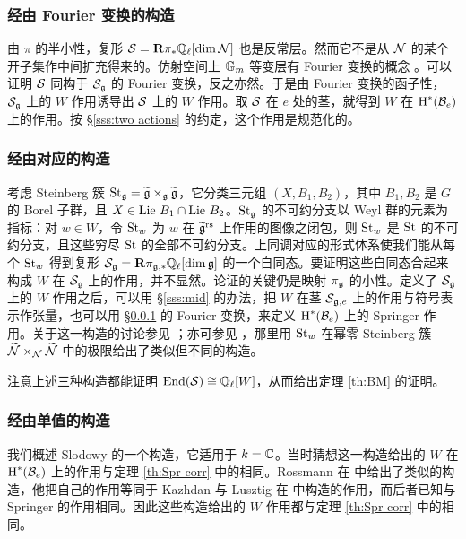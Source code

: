 \subsubsection{经由 Fourier 变换的构造}\label{sss:Four} 由 $\pi$ 的半小性，复形 $\mathcal{S}=\mathbf{R}\pi_{*}\mathbb{Q}_{\ell}[\dim\mathcal{N}]$ 也是反常层。然而它不是从 $\mathcal{N}$ 的某个开子集作中间扩充得来的。仿射空间上 $\mathbb{G}_m$ 等变层有 Fourier 变换的概念 \cite{Laumon}。可以证明 $\mathcal{S}$ 同构于 $\mathcal{S}_{\mathfrak{g}}$ 的 Fourier 变换，反之亦然。于是由 Fourier 变换的函子性，$\mathcal{S}_{\mathfrak{g}}$ 上的 $W$ 作用诱导出 $\mathcal{S}$ 上的 $W$ 作用。取 $\mathcal{S}$ 在 $e$ 处的茎，就得到 $W$ 在 $\textup{H}^{*}({\mathcal{B}_{e}})$ 上的作用。按 \S\ref{sss:two actions} 的约定，这个作用是规范化的。

\subsubsection{经由对应的构造} 考虑 Steinberg 簇 $\textup{St}_{\mathfrak{g}}=\widetilde{\mathfrak{g}}\times_{\mathfrak{g}}\widetilde{\mathfrak{g}}$，它分类三元组 $(X,B_{1},B_{2})$，其中 $B_{1},B_{2}$ 是 $G$ 的 Borel 子群，且 $X\in\textup{Lie}\  B_{1}\cap\textup{Lie}\  B_{2}$。$\textup{St}_{\mathfrak{g}}$ 的不可约分支以 Weyl 群的元素为指标：对 $w\in W$，令 $\textup{St}_{w}$ 为 $w$ 在 $\widetilde{\mathfrak{g}}^{\textup{rs}}$ 上作用的图像之闭包，则 $\textup{St}_{w}$ 是 $\textup{St}$ 的不可约分支，且这些穷尽 $\textup{St}$ 的全部不可约分支。上同调对应的形式体系使我们能从每个 $\textup{St}_{w}$ 得到复形 $\mathcal{S}_{\mathfrak{g}}=\mathbf{R}\pi_{\mathfrak{g},*}\mathbb{Q}_{\ell}[\dim\mathfrak{g}]$ 的一个自同态。要证明这些自同态合起来构成 $W$ 在 $\mathcal{S}_{\mathfrak{g}}$ 上的作用，并不显然。论证的关键仍是映射 $\pi_{\mathfrak{g}}$ 的小性。定义了 $\mathcal{S}_{\mathfrak{g}}$ 上的 $W$ 作用之后，可以用 \S\ref{sss:mid} 的办法，把 $W$ 在茎 $\mathcal{S}_{\mathfrak{g}, e}$ 上的作用与符号表示作张量，也可以用 \S\ref{sss:Four} 的 Fourier 变换，来定义 $\textup{H}^{*}({\mathcal{B}_{e}})$ 上的 Springer 作用。关于这一构造的讨论参见 \cite[Remark 3.3.4]{GS}；亦可参见 \cite[\S3.4]{CG}，那里用 $\textup{St}_{w}$ 在幂零 Steinberg 簇 $\widetilde{\mathcal{N}}\times_{\mathcal{N}}\widetilde{\mathcal{N}}$ 中的极限给出了类似但不同的构造。

注意上述三种构造都能证明 $\textup{End}(\mathcal{S})\cong\mathbb{Q}_{\ell}[W]$，从而给出定理 \ref{th:BM} 的证明。

\subsubsection{经由单值的构造} 我们概述 Slodowy \cite[\S4]{Slo4} 的一个构造，它适用于 $k=\mathbb{C}$。当时猜想这一构造给出的 $W$ 在 $\textup{H}^{*}({\mathcal{B}_{e}})$ 上的作用与定理 \ref{th:Spr corr} 中的相同。Rossmann 在 \cite[\S2]{Rossmann} 中给出了类似的构造，他把自己的作用等同于 Kazhdan 与 Lusztig 在 \cite{KL80} 中构造的作用，而后者已知与 Springer 的作用相同。因此这些构造给出的 $W$ 作用都与定理 \ref{th:Spr corr} 中的相同。

